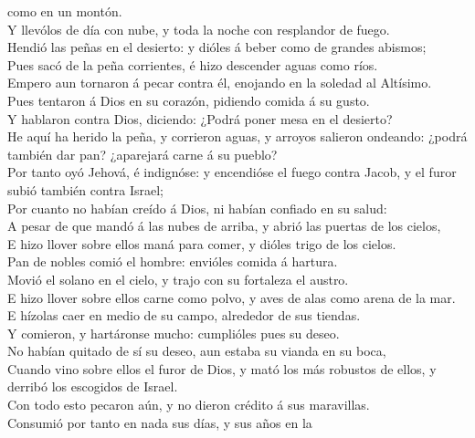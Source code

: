 como en un montón.\\
 Y llevólos de día con nube, y toda la noche con resplandor
de fuego.\\
 Hendió las peñas en el desierto: y dióles á beber como de
grandes abismos;\\
 Pues sacó de la peña corrientes, é hizo descender aguas
como ríos.\\
 Empero aun tornaron á pecar contra él, enojando en la
soledad al Altísimo.\\
 Pues tentaron á Dios en su corazón, pidiendo comida á su
gusto.\\
 Y hablaron contra Dios, diciendo: ¿Podrá poner mesa en el
desierto?\\
 He aquí ha herido la peña, y corrieron aguas, y arroyos
salieron ondeando: ¿podrá también dar pan? ¿aparejará carne á su
pueblo?\\
 Por tanto oyó Jehová, é indignóse: y encendióse el fuego
contra Jacob, y el furor subió también contra Israel;\\
 Por cuanto no habían creído á Dios, ni habían confiado en
su salud:\\
 A pesar de que mandó á las nubes de arriba, y abrió las
puertas de los cielos,\\
 E hizo llover sobre ellos maná para comer, y dióles trigo
de los cielos.\\
 Pan de nobles comió el hombre: envióles comida á
hartura.\\
 Movió el solano en el cielo, y trajo con su fortaleza el
austro.\\
 E hizo llover sobre ellos carne como polvo, y aves de alas
como arena de la mar.\\
 E hízolas caer en medio de su campo, alrededor de sus
tiendas.\\
 Y comieron, y hartáronse mucho: cumplióles pues su
deseo.\\
 No habían quitado de sí su deseo, aun estaba su vianda en
su boca,\\
 Cuando vino sobre ellos el furor de Dios, y mató los más
robustos de ellos, y derribó los escogidos de Israel.\\
 Con todo esto pecaron aún, y no dieron crédito á sus
maravillas.\\
 Consumió por tanto en nada sus días, y sus años en la
